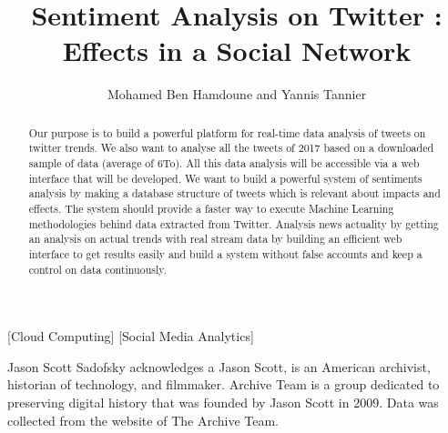 \documentclass{acmtog} %
\begin{document}

\title{Sentiment Analysis on Twitter : Effects in a Social Network} %

\author{Mohamed Ben Hamdoune {\upshape and} Yannis Tannier
}

[Cloud Computing]
[Social Media Analytics]




\maketitle

\begin{bottomstuff}
Jason Scott Sadofsky acknowledges a Jason Scott, is an American archivist, historian of technology, and filmmaker. Archive Team is a group dedicated to preserving digital history that was founded by Jason Scott in 2009. Data was collected from the website of The Archive Team.

\end{bottomstuff}


\begin{abstract}

Our purpose is to build a powerful platform for real-time data analysis of tweets on twitter trends. We also want to analyse all the tweets of 2017 based on a downloaded sample of data (average of 6To). All this data analysis will be accessible via a web interface that will be developed. We want to build a powerful system of sentiments analysis by making a database structure of tweets which is relevant about impacts and effects. The system should provide a faster way to execute Machine Learning methodologies behind data extracted from Twitter. Analysis news actuality by getting an analysis on actual trends with real stream data by building an efficient web interface to get results easily and build a system without false accounts and keep a control on data continuously.
\end{abstract}
\end{document}
